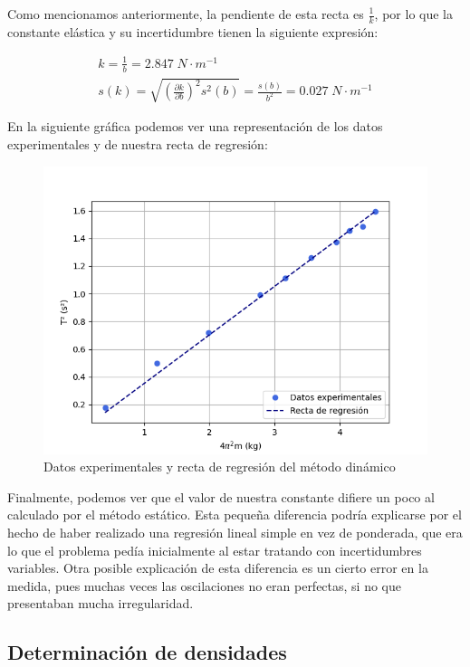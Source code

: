 \documentclass[a4paper,12pt,titlepage]{article}
\begin{document}
Como mencionamos anteriormente, la pendiente de esta recta es $\frac{1}{k}$, por lo que la constante elástica y su incertidumbre tienen la siguiente expresión:

\begin{equation}
    \begin{gathered}
        k = \frac{1}{b} = 2.847 \; N\cdot m^{-1} \\
        s(k) = \sqrt{\left (\frac{\partial k}{\partial b} \right )^2s^2(b)} = \frac{s(b)}{b^2} = 0.027 \; N\cdot m^{-1}
    \end{gathered}
\end{equation}

En la siguiente gráfica podemos ver una representación de los datos experimentales y de nuestra recta de regresión:

\begin{figure}[h!]
    \centering
    \includegraphics[width=0.75\linewidth]{Images/RegDinamico.png}
    \caption{Datos experimentales y recta de regresión del método dinámico}
\end{figure}

\newpage

Finalmente, podemos ver que el valor de nuestra constante difiere un poco al calculado por el método estático. Esta pequeña diferencia podría explicarse por el hecho de haber realizado una regresión lineal simple en vez de ponderada, que era lo que el problema pedía inicialmente al estar tratando con incertidumbres variables. Otra posible explicación de esta diferencia es un cierto error en la medida, pues muchas veces las oscilaciones no eran perfectas, si no que presentaban mucha irregularidad.



\subsection{Determinación de densidades}
\end{document}
